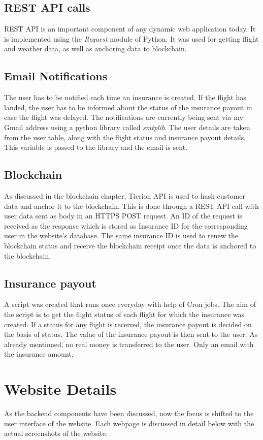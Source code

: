 \subsection{REST API calls}
REST API is an important component of any dynamic web application today. It is implemented using the \textit{Request} module of Python. It was used for getting flight and weather data, as well as anchoring data to blockchain. 

\subsection{Email Notifications}
The user has to be notified each time an insurance is created. If the flight has landed, the user has to be informed about the status of the insurance payout in case the flight was delayed. The notifications are currently being sent via my Gmail address using a python library called \textit{smtplib}. The user details are taken from the user table, along with the flight status and insurance payout details. This variable is passed to the library and the email is sent.

\subsection{Blockchain}
As discussed in the blockchain chapter, Tierion API is used to hash customer data and anchor it to the blockchain. This is done through a REST API call with user data sent as body in an HTTPS POST request. An ID of the request is received as the response which is stored as Insurance ID for the corresponding user in the website's database. The same insurance ID is used to renew the blockchain status and receive the blockchain receipt once the data is anchored to the blockchain.

\subsection{Insurance payout}
A script was created that runs once everyday with help of Cron jobs. The aim of the script is to get the flight status of each flight for which the insurance was created. If a status for any flight is received, the insurance payout is decided on the basis of status. The value of the insurance payout is then sent to the user. As already mentioned, no real money is transferred to the user. Only an email with the insurance amount.

\section{Website Details}
As the backend components have been discussed, now the focus is shifted to the user interface of the website. Each webpage is discussed in detail below with the actual screenshots of the website.

